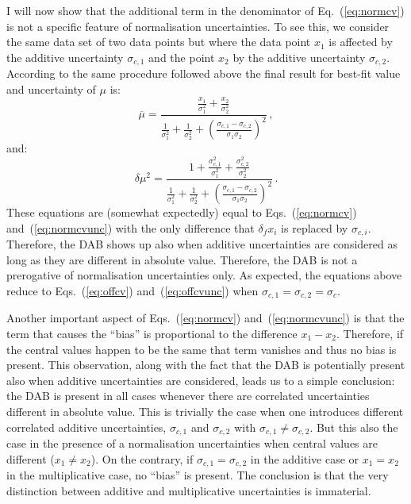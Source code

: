 \documentclass[10pt,a4paper]{article}
\begin{document}
I will now show that the additional term in the denominator of
Eq.~(\ref{eq:normcv}) is not a specific feature of normalisation
uncertainties. To see this, we consider the same data set of two data
points but where the data point $x_1$ is affected by the additive
uncertainty $\sigma_{c,1}$ and the point $x_2$ by the additive
uncertainty $\sigma_{c,2}$. According to the same procedure followed
above the final result for best-fit value and uncertainty of $\mu$ is:
\begin{equation}\label{eq:add2cv}
\overline{\mu} = \frac{\frac{x_1}{\sigma_1^2}+\frac{x_2}{\sigma_2^2}}{\frac{1}{\sigma_1^2}+\frac{1}{\sigma_2^2}+\left(\frac{\sigma_{c,1}-\sigma_{c,2}}{\sigma_1\sigma_2}\right)^2}\,,
\end{equation}
and:
\begin{equation}
  \delta\mu^2=\frac{1+\frac{\sigma_{c,1}^2}{\sigma_1^2}+\frac{\sigma_{c,2}^2}{\sigma_2^2}}{\frac{1}{\sigma_1^2}+ \frac{1}{\sigma_2^2}+\left(\frac{\sigma_{c,1} -\sigma_{c,2}}{\sigma_1\sigma_2}\right)^2}\,.
\end{equation}
These equations are (somewhat expectedly) equal to
Eqs.~(\ref{eq:normcv}) and~(\ref{eq:normcvunc}) with the only
difference that $\delta_fx_i$ is replaced by
$\sigma_{c,i}$. Therefore, the DAB shows up also when additive
uncertainties are considered as long as they are different in absolute
value. Therefore, the DAB is not a prerogative of normalisation
uncertainties only. As expected, the equations above reduce to
Eqs.~(\ref{eq:offcv}) and~(\ref{eq:offcvunc}) when
$\sigma_{c,1}=\sigma_{c,2}=\sigma_{c}$.

Another important aspect of Eqs.~(\ref{eq:normcv})
and~(\ref{eq:normcvunc}) is that the term that causes the ``bias'' is
proportional to the difference $x_1-x_2$. Therefore, if the central
values happen to be the same that term vanishes and thus no bias is
present. This observation, along with the fact that the DAB is
potentially present also when additive uncertainties are considered,
leads us to a simple conclusion: the DAB is present in all cases
whenever there are correlated uncertainties different in absolute
value. This is trivially the case when one introduces different
correlated additive uncertainties, $\sigma_{c,1}$ and $\sigma_{c,2}$
with $\sigma_{c,1}\neq \sigma_{c,2}$. But this also the case in the
presence of a normalisation uncertainties when central values are
different ($x_1\neq x_2$). On the contrary, if
$\sigma_{c,1}= \sigma_{c,2}$ in the additive case or $x_1=x_2$ in the
multiplicative case, no ``bias'' is present. The conclusion is that
the very distinction between additive and multiplicative uncertainties
is immaterial.
\end{document}
